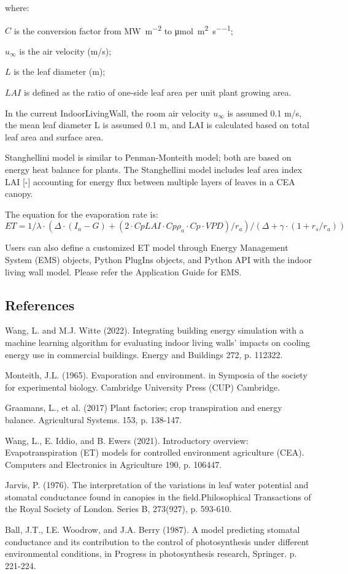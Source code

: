 where:

\(C\) is the conversion factor from \unit{\mega\watt\per\square\meter} to \unit{\micro\mole\per\square\meter\per\second};

\(u_\infty\) is the air velocity (m/s);

\(L\) is the leaf diameter (m);

\(LAI\) is defined as the ratio of one-side leaf area per unit plant growing area. 

In the current IndoorLivingWall, the room air velocity \(u_\infty\) is assumed 0.1 m/s, the mean leaf diameter L is assumed 0.1 m, and LAI is calculated based on total leaf area and surface area. 

Stanghellini model is similar to Penman-Monteith model; both are based on energy heat balance for plants. The Stanghellini model includes leaf area index LAI [-] accounting for energy flux between multiple layers of leaves in a CEA canopy. 

The equation for the evaporation rate is:
\begin{equation}
ET=1/\lambda \cdot (\Delta \cdot(I_n-G)+(2 \cdot Cp LAI \cdot Cp \rho_a \cdot Cp \cdot VPD)/r_a )/(\Delta+\gamma \cdot (1+r_s/r_a ) )
\end{equation}

Users can also define a customized ET model through Energy Management System (EMS) objects, Python PlugIns objects, and Python API with the indoor living wall model. Please refer the Application Guide for EMS. 

\subsection{References}\label{references-indoorlivingwall}

Wang, L. and M.J. Witte (2022). Integrating building energy simulation with a machine learning algorithm for evaluating indoor living walls’ impacts on cooling energy use in commercial buildings. Energy and Buildings 272, p. 112322.

  Monteith, J.L. (1965). Evaporation and environment. in Symposia of the society for experimental biology. Cambridge University Press (CUP) Cambridge.
  
  Graamans, L., et al. (2017) Plant factories; crop transpiration and energy balance. Agricultural Systems. 153, p. 138-147.
  
  Wang, L., E. Iddio, and B. Ewers (2021). Introductory overview: Evapotranspiration (ET) models for controlled environment agriculture (CEA). Computers and Electronics in Agriculture 190, p. 106447.
  
  Jarvis, P. (1976). The interpretation of the variations in leaf water potential and stomatal conductance found in canopies in the field.Philosophical Transactions of the Royal Society of London. Series B, 273(927), p. 593-610.
  
  Ball, J.T., I.E. Woodrow, and J.A. Berry (1987). A model predicting stomatal conductance and its contribution to the control of photosynthesis under different environmental conditions, in Progress in photosynthesis research, Springer. p. 221-224.

